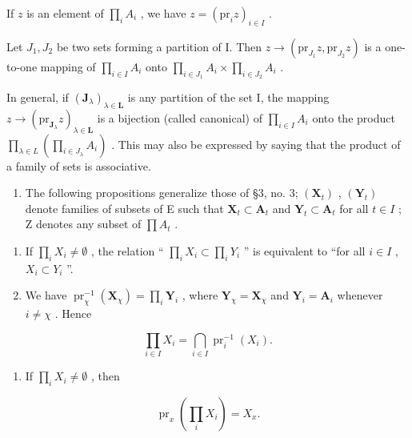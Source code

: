 If \(z\) is an element of \(\prod_{i} A_{i}\) , we have \(z = (\mathrm{pr}_{i}z)_{i \in I}\) .

Let \(J_1, J_2\) be two sets forming a partition of I. Then \(z \to (\mathrm{pr}_{J_1}z, \mathrm{pr}_{J_2}z)\) is a one-to-one mapping of \(\prod_{i\in I} A_i\) onto \(\prod_{i\in J_1} A_i \times \prod_{i\in J_2} A_i\) .

In general, if \((\mathbf{J}_{\lambda})_{\lambda \in \mathbf{L}}\) is any partition of the set I, the mapping \(z \to (\mathrm{pr}_{\mathbf{J}_{\lambda}} z)_{\lambda \in \mathbf{L}}\) is a bijection (called canonical) of \(\prod_{i \in I} A_i\) onto the product \(\prod_{\lambda \in L} \left( \prod_{i \in J_{\lambda}} A_i \right)\) . This may also be expressed by saying that the product of a family of sets is associative.

\begin{enumerate}
\def\labelenumi{\arabic{enumi}.}
\setcounter{enumi}{11}
\tightlist
\item
  The following propositions generalize those of §3, no. 3; \((\mathbf{X}_t)\) , \((\mathbf{Y}_t)\) denote families of subsets of E such that \(\mathbf{X}_t \subset \mathbf{A}_t\) and \(\mathbf{Y}_t \subset \mathbf{A}_t\) for all \(t \in I\) ; Z denotes any subset of \(\prod A_t\) .
\end{enumerate}

\begin{enumerate}
\def\labelenumi{(\alph{enumi})}
\item
  If \(\prod_{i} X_{i} \neq \emptyset\) , the relation `` \(\prod_{i} X_{i} \subset \prod_{i} Y_{i}\) '' is equivalent to ``for all \(i \in I\) , \(X_{i} \subset Y_{i}\) ''.
\item
  We have \(\operatorname{pr}_{\chi}^{-1}(\mathbf{X}_{\chi}) = \prod_{i} \mathbf{Y}_{i}\) , where \(\mathbf{Y}_{\chi} = \mathbf{X}_{\chi}\) and \(\mathbf{Y}_{i} = \mathbf{A}_{i}\) whenever \(i \neq \chi\) . Hence
\end{enumerate}

\[
\prod_ {i \in I} X _ {i} = \bigcap_ {i \in I} \operatorname{pr}_{i}^{-1}(X _ {i}).\tag{47}
\]

\begin{enumerate}
\def\labelenumi{(\alph{enumi})}
\setcounter{enumi}{2}
\tightlist
\item
  If \(\prod_{i} X_i \neq \emptyset\) , then
\end{enumerate}

\[
\operatorname{pr} _ {x} \left(\prod_ {i} X _ {i}\right) = X _ {x}.\tag{48}
\]

